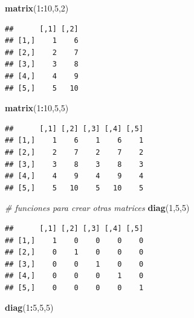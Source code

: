 \documentclass[
]{book}
\newenvironment{Shaded}{\begin{snugshade}}{\end{snugshade}}
\newcommand{\CommentTok}[1]{\textcolor[rgb]{0.56,0.35,0.01}{\textit{#1}}}
\newcommand{\DecValTok}[1]{\textcolor[rgb]{0.00,0.00,0.81}{#1}}
\newcommand{\KeywordTok}[1]{\textcolor[rgb]{0.13,0.29,0.53}{\textbf{#1}}}
\newcommand{\NormalTok}[1]{#1}
\newcommand{\OperatorTok}[1]{\textcolor[rgb]{0.81,0.36,0.00}{\textbf{#1}}}
\begin{document}
\begin{Shaded}
\begin{Highlighting}[]
\KeywordTok{matrix}\NormalTok{(}\DecValTok{1}\OperatorTok{:}\DecValTok{10}\NormalTok{,}\DecValTok{5}\NormalTok{,}\DecValTok{2}\NormalTok{)}
\end{Highlighting}
\end{Shaded}

\begin{verbatim}
##      [,1] [,2]
## [1,]    1    6
## [2,]    2    7
## [3,]    3    8
## [4,]    4    9
## [5,]    5   10
\end{verbatim}

\begin{Shaded}
\begin{Highlighting}[]
\KeywordTok{matrix}\NormalTok{(}\DecValTok{1}\OperatorTok{:}\DecValTok{10}\NormalTok{,}\DecValTok{5}\NormalTok{,}\DecValTok{5}\NormalTok{)}
\end{Highlighting}
\end{Shaded}

\begin{verbatim}
##      [,1] [,2] [,3] [,4] [,5]
## [1,]    1    6    1    6    1
## [2,]    2    7    2    7    2
## [3,]    3    8    3    8    3
## [4,]    4    9    4    9    4
## [5,]    5   10    5   10    5
\end{verbatim}

\begin{Shaded}
\begin{Highlighting}[]
\CommentTok{# funciones para crear otras matrices}
\KeywordTok{diag}\NormalTok{(}\DecValTok{1}\NormalTok{,}\DecValTok{5}\NormalTok{,}\DecValTok{5}\NormalTok{)}
\end{Highlighting}
\end{Shaded}

\begin{verbatim}
##      [,1] [,2] [,3] [,4] [,5]
## [1,]    1    0    0    0    0
## [2,]    0    1    0    0    0
## [3,]    0    0    1    0    0
## [4,]    0    0    0    1    0
## [5,]    0    0    0    0    1
\end{verbatim}

\begin{Shaded}
\begin{Highlighting}[]
\KeywordTok{diag}\NormalTok{(}\DecValTok{1}\OperatorTok{:}\DecValTok{5}\NormalTok{,}\DecValTok{5}\NormalTok{,}\DecValTok{5}\NormalTok{)}
\end{Highlighting}
\end{Shaded}
\end{document}
